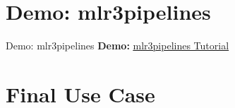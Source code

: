 \documentclass[11pt,compress]{beamer}
\begin{document}
\section{Demo: mlr3pipelines}
\begin{frame}{Demo: mlr3pipelines}
\textbf{Demo:} \href{https://mlr3gallery.mlr-org.com/posts/2020-03-11-mlr3pipelines-tutorial-german-credit/}{\underline{mlr3pipelines Tutorial}}
\end{frame}

\section{Final Use Case}

% 
% 
\end{document}
